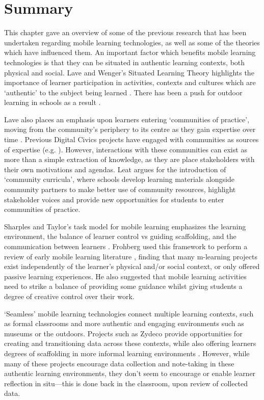 \section{Summary}
This chapter gave an overview of some of the previous research that has been undertaken regarding mobile learning technologies, as well as some of the theories which have influenced them.
An important factor which benefits mobile learning technologies is that they can be situated in authentic learning contexts, both physical and social. Lave and Wenger's Situated Learning Theory highlights the importance of learner participation in activities, contexts and cultures which are `authentic' to the subject being learned \citep{lave1991situated}. There has been a push for outdoor learning in schools as a result \citep{Fiennes2015}.

Lave also places an emphasis upon learners entering `communities of practice', moving from the community's periphery to its centre as they gain expertise over time \citep{Lave1991}. Previous Digital Civics projects have engaged with communities as sources of expertise (e.g. \citep{Dodds2017, Rainey2019}). However, interactions with these communities can exist as more than a simple extraction of knowledge, as they are place stakeholders with their own motivations and agendas. Leat argues for the introduction of `community curricula', where schools develop learning materials alongside community partners to make better use of community resources, highlight stakeholder voices and provide new opportunities for students to enter communities of practice.

Sharples and Taylor's task model for mobile learning emphasizes the learning environment, the balance of learner control vs guiding scaffolding, and the communication between learners \citep{Sharples2007}. Frohberg used this framework to perform a review of early mobile learning literature \citep{Frohberg2009}, finding that many m-learning projects exist independently of the learner's physical and/or social context, or only offered passive learning experiences. He also suggested that mobile learning activities need to strike a balance of providing some guidance whilst giving students a degree of creative control over their work.

`Seamless' mobile learning technologies connect multiple learning contexts, such as formal classrooms and more authentic and engaging environments such as museums or the outdoors. Projects such as Zydeco provide opportunities for creating and transitioning data across these contexts, while also offering learners degrees of scaffolding in more informal learning environments \citep{kuhn2011}. However, while many of these projects encourage data collection and note-taking in these authentic learning environments, they don't seem to encourage or enable learner reflection in situ---this is done back in the classroom, upon review of collected data.


